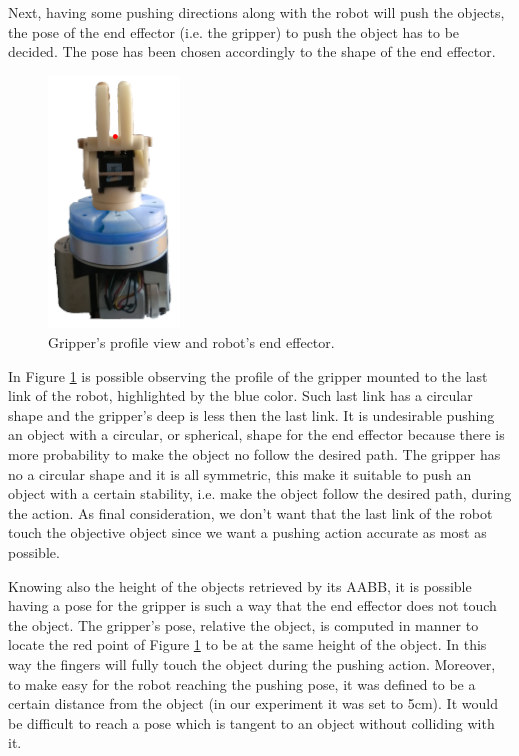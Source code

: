 Next, having some pushing directions along with the robot will push the objects, the pose of the end effector (i.e. the gripper) to push the object has to be decided. The pose has been chosen accordingly to the shape of the end effector.
\begin{figure}
\centering
\includegraphics[width=3.5cm]{Img/set_up/gripper_side2.png}
\caption{Gripper's profile view and robot's end effector.}\label{fig:gripper_side}
\end{figure}
In Figure \ref{fig:gripper_side}
is possible observing the profile of the gripper mounted to the last link of the robot, highlighted by the blue color. Such last link has a circular shape and the gripper's deep is less then the last link. It is undesirable pushing an object with a circular, or spherical, shape for the end effector because there is more probability to make the object no follow the desired path. The gripper has no a circular shape and it is all symmetric, this make it suitable to push an object with a certain stability, i.e. make the object follow the desired path, during the action. As final consideration, we don't want that the last link of the robot touch the objective object since we want a pushing action accurate as most as possible. 

Knowing also the height of the objects retrieved by its AABB, it is possible having a pose for the gripper is such a way that the end effector does not touch the object. The gripper's pose, relative the object, is computed in manner to locate the red point of Figure \ref{fig:gripper_side} to be at the same height of the object. In this way the fingers will fully touch the object during the pushing action. Moreover, to make easy for the robot reaching the pushing pose, it was defined to be a certain distance from the object (in our experiment it was set to 5cm). It would be difficult to reach a pose which is tangent to an object without colliding with it.  

